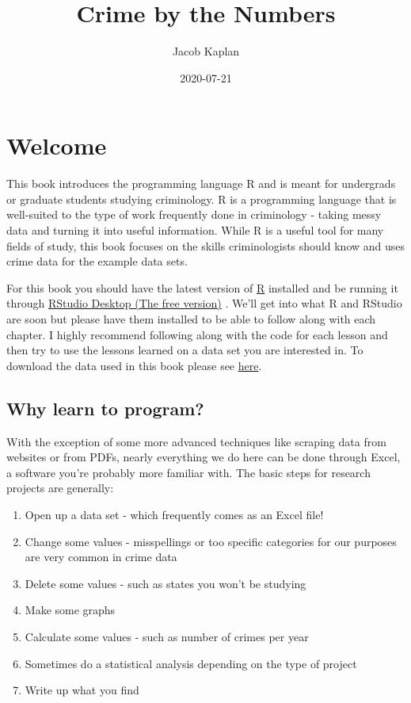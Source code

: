 \documentclass[
  12pt,
]{book}
\title{Crime by the Numbers}
\author{Jacob Kaplan}
\date{2020-07-21}
\providecommand{\tightlist}{%
  \setlength{\itemsep}{0pt}\setlength{\parskip}{0pt}}
\begin{document}
\maketitle

{
\hypersetup{linkcolor=}
\setcounter{tocdepth}{2}
\tableofcontents
}
\hypertarget{welcome}{%
\chapter*{Welcome}\label{welcome}}


This book introduces the programming language R and is meant for undergrads or graduate students studying criminology. R is a programming language that is well-suited to the type of work frequently done in criminology - taking messy data and turning it into useful information. While R is a useful tool for many fields of study, this book focuses on the skills criminologists should know and uses crime data for the example data sets.

For this book you should have the latest version of \href{https://cloud.r-project.org/}{R} installed and be running it through \href{https://www.rstudio.com/products/rstudio/download/}{RStudio Desktop (The free version)} . We'll get into what R and RStudio are soon but please have them installed to be able to follow along with each chapter. I highly recommend following along with the code for each lesson and then try to use the lessons learned on a data set you are interested in. To download the data used in this book please see \href{https://github.com/jacobkap/r4crimz/tree/master/data}{here}.

\hypertarget{why-learn-to-program}{%
\section*{Why learn to program?}\label{why-learn-to-program}}


With the exception of some more advanced techniques like scraping data from websites or from PDFs, nearly everything we do here can be done through Excel, a software you're probably more familiar with. The basic steps for research projects are generally:

\begin{enumerate}
\def\labelenumi{\arabic{enumi}.}
\tightlist
\item
  Open up a data set - which frequently comes as an Excel file!
\item
  Change some values - misspellings or too specific categories for our purposes are very common in crime data
\item
  Delete some values - such as states you won't be studying
\item
  Make some graphs
\item
  Calculate some values - such as number of crimes per year
\item
  Sometimes do a statistical analysis depending on the type of project
\item
  Write up what you find
\end{enumerate}
\end{document}
